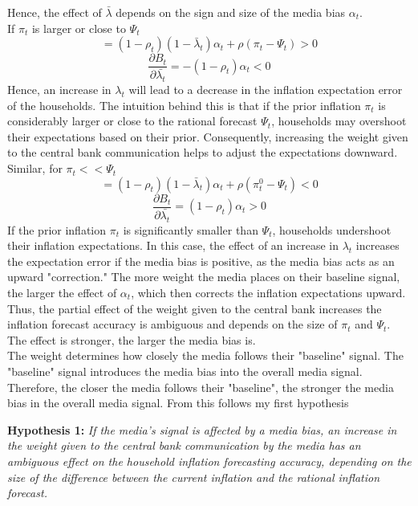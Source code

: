 \documentclass[review]{elsarticle}
\begin{document}
Hence, the effect of $\bar{\lambda}$ depends on the sign and size of the media bias $\alpha_t$.   
\\
If $\pi_t$ is larger or close to $\Psi_t$ 
\begin{equation}
= (1-\rho_t)(1-\bar{\lambda}_t)\alpha_t + \rho(\pi_t - \Psi_t) > 0
\end{equation} 
\begin{equation}
\frac{\partial B_t}{\partial \bar{\lambda_t}} = -(1-\rho_t)\alpha_t < 0
\end{equation}
Hence, an increase in $\lambda_t$ will lead to a decrease in the inflation expectation error of the households. The intuition behind this is that if the prior inflation $\pi_t$ is considerably larger or close to the rational forecast $\Psi_t$, households may overshoot their expectations based on their prior. Consequently, increasing the weight given to the central bank communication helps to adjust the expectations downward.
\\
Similar, for $\pi_t <<\Psi_t$
\begin{equation}
= (1-\rho_t)(1-\bar{\lambda}_t)\alpha_t + \rho(\pi_t^0 - \Psi_t) < 0
\end{equation}
\begin{equation}
\frac{\partial B_t}{\partial \bar{\lambda_t}} = (1-\rho_t)\alpha_t > 0
\end{equation}
If the prior inflation $\pi_t$ is significantly smaller than $\Psi_t$, households undershoot their inflation expectations. In this case, the effect of an increase in $\lambda_t$ increases the expectation error if the media bias is positive, as the media bias acts as an upward "correction." The more weight the media places on their baseline signal, the larger the effect of $\alpha_t$, which then corrects the inflation expectations upward.
\\ 
Thus, the partial effect of the weight given to the central bank increases the inflation forecast accuracy is ambiguous and depends on the size of $\pi_t$ and $\Psi_t$. The effect is stronger, the larger the media bias is. 
\\
The weight determines how closely the media follows their "baseline" signal. The "baseline" signal introduces the media bias into the overall media signal. Therefore, the closer the media follows their "baseline", the stronger the media bias in the overall media signal. 
From this follows my first hypothesis
\par
\textbf{Hypothesis 1:} \textit{If the media's signal is affected by a media bias, an increase in the weight given to the central bank communication by the media has an ambiguous effect on the household inflation forecasting accuracy, depending on the size of the difference between the current inflation and the rational inflation forecast.} 
\end{document}
